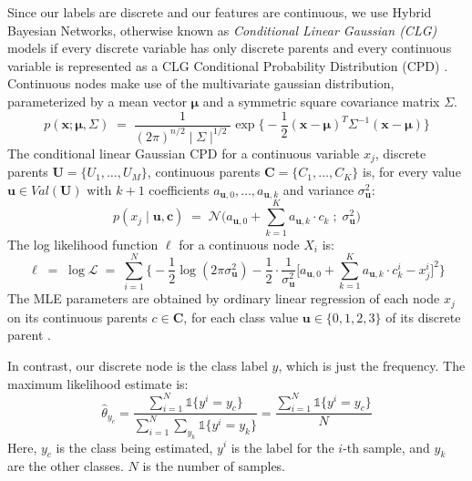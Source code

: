 \documentclass{article}
\begin{document}
Since our labels are discrete and our features are continuous, we use
Hybrid Bayesian Networks, otherwise known as
\textit{Conditional Linear Gaussian (CLG)} models if
every discrete variable has only discrete parents and every continuous variable
is represented as a CLG Conditional Probability Distribution (CPD) \cite{koller}.
Continuous nodes make use of the multivariate gaussian distribution, parameterized
by a mean vector $\mathbf{\mu}$ and a symmetric square covariance matrix $\Sigma$.
\begin{equation}
  p(\mathbf{x}; \mathbf{\mu}, \Sigma) \; = \; \frac{1}{(2 \pi)^{n/2} \mid \Sigma \mid^{1/2}} \exp \Big\{ -\frac{1}{2} (\mathbf{x} - \mathbf{\mu})^T \Sigma^{-1} (\mathbf{x} - \mathbf{\mu})  \Big\}
\end{equation}
The conditional linear Gaussian CPD for a continuous variable $x_j$, discrete
parents $\mathbf{U} = \{U_1, \hdots, U_M\}$, continuous parents
$\mathbf{C} = \{C_1, \hdots, C_K\}$ is, for every value
$\mathbf{u} \in Val(\mathbf{U})$ with $k+1$ coefficients
$a_{\mathbf{u},0}, \hdots, a_{\mathbf{u}, k}$ and variance
$\sigma^2_{\mathbf{u}}$:
\begin{equation}
  p(x_j \mid \mathbf{u}, \mathbf{c}) \; = \; \mathcal{N} \Bigg(a_{\mathbf{u},0} + \sum_{k=1}^K a_{\mathbf{u},k} \cdot c_k \; ; \; \sigma^2_{\mathbf{u}}  \Bigg)
\end{equation}
The log likelihood function $\ell$ for a continuous node $X_i$ is:
\begin{equation}
  \ell \; = \; \log \mathcal{L} \; = \; \sum_{i=1}^{N} \Bigg\{ -\frac{1}{2} \log (2\pi \sigma^2_{\mathbf{u}}) - \frac{1}{2} \cdot \frac{1}{\sigma^2_{\mathbf{u}}} \Bigg[ a_{\mathbf{u},0} + \sum_{k=1}^K a_{\mathbf{u},k} \cdot c_k^i - x_j^i \Bigg]^2 \Bigg\}
\end{equation}
The MLE parameters are obtained by ordinary linear regression of each node $x_j$
on its continuous parents $c \in \mathbf{C}$, for each class value
$\mathbf{u} \in \{0, 1, 2, 3\}$ of its discrete parent \cite{koller}.

In contrast, our discrete node is the class label $y$, which is just the frequency.
The maximum likelihood estimate is:
\begin{equation}
  \hat{\theta}_{y_c} = \frac{ \sum_{i=1}^{N} \mathds{1} \{ y^{i} = y_c \} }{ \sum_{i=1}^{N} \sum_{y_k} \mathds{1} \{y^i = y_k\} } = \frac{\sum_{i=1}^{N} \mathds{1} \{ y^{i} = y_c \}}{N}
\end{equation}
Here, $y_c$ is the class being estimated, $y^i$ is the label for the $i$-th sample,
and $y_k$ are the other classes. $N$ is the number of samples.
\end{document}
